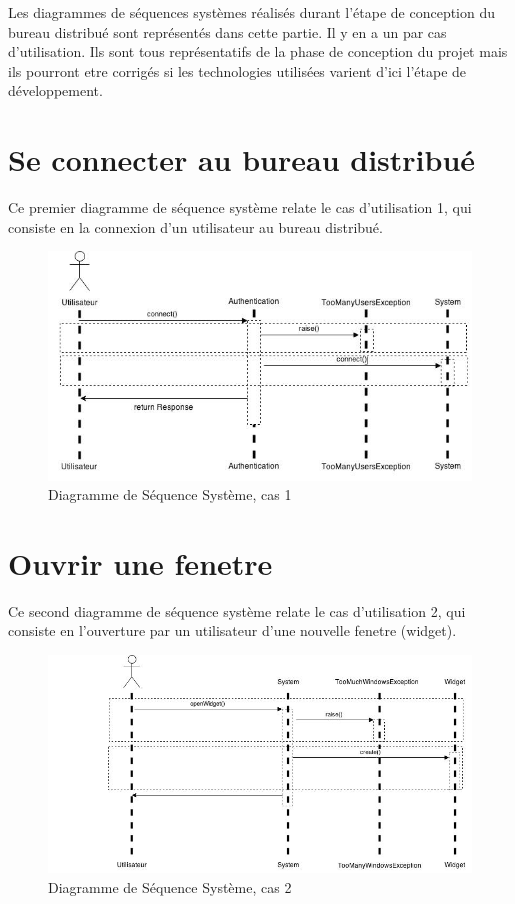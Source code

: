 Les diagrammes de séquences systèmes réalisés durant l'étape
de conception du bureau distribué sont représentés dans cette 
partie. Il y en a un par cas d'utilisation. 
Ils sont tous représentatifs de la phase de conception du projet
mais ils pourront etre corrigés si les technologies utilisées
varient d'ici l'étape de développement.

\section{Se connecter au bureau distribué}

Ce premier diagramme de séquence système relate le cas d'utilisation
1, qui consiste en la connexion d'un utilisateur au bureau distribué.

\begin{figure}[h!]
	\centering
	\includegraphics[scale=0.4]{diagrammes/DSS1.jpg}
	\caption{Diagramme de Séquence Système, cas 1}
\end{figure}

\section{Ouvrir une fenetre}

Ce second diagramme de séquence système relate le cas d'utilisation
2, qui consiste en l'ouverture par un utilisateur d'une nouvelle 
fenetre (widget).

\begin{figure}[h!]
	\centering
	\includegraphics[scale=0.4]{diagrammes/DSS2.jpg}
	\caption{Diagramme de Séquence Système, cas 2}
\end{figure}
\newpage
